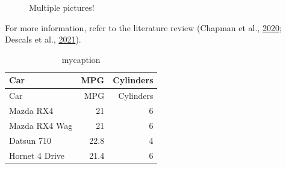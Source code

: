 \documentclass[
  letterpaper,
  DIV=11,
  numbers=noendperiod]{scrreprt}
\begin{document}
\begin{figure}

\begin{minipage}[t]{0.50\linewidth}

{\centering 


}

\end{minipage}%
%
\begin{minipage}[t]{0.50\linewidth}

{\centering 


}

\end{minipage}%

\caption{\label{fig-elephants}Multiple pictures!}

\end{figure}

For more information, refer to the literature review (Chapman et al.,
\protect\hyperlink{ref-chapmanCompoundingImpactDeforestation2020}{2020};
Descals et al.,
\protect\hyperlink{ref-descalsHighresolutionGlobalMap2021}{2021}).

\hypertarget{tbl-mytable4}{}
\begin{longtable}[]{@{}lrr@{}}
\caption{\label{tbl-mytable4}mycaption}\tabularnewline
\toprule\noalign{}
Car & MPG & Cylinders \\
\midrule\noalign{}
\endfirsthead
\toprule\noalign{}
Car & MPG & Cylinders \\
\midrule\noalign{}
\endhead
\bottomrule\noalign{}
\endlastfoot
Mazda RX4 & 21 & 6 \\
Mazda RX4 Wag & 21 & 6 \\
Datsun 710 & 22.8 & 4 \\
Hornet 4 Drive & 21.4 & 6 \\
\end{longtable}
\end{document}
